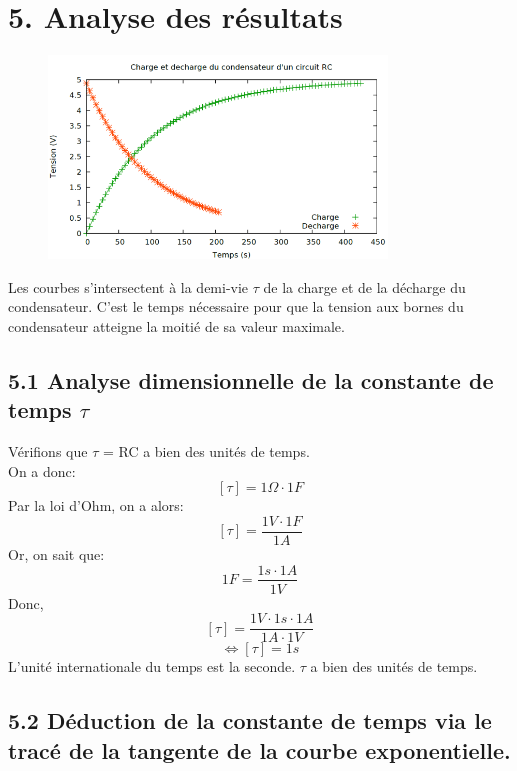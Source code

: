 \documentclass{report}
\begin{document}
\section*{5. Analyse des r\'esultats}
\begin{figure}[ht!]
\centering
\includegraphics[width=90mm]{chargeEtDech.png}
\label{overflow}
\end{figure}
Les courbes s'intersectent \`a la demi-vie $\tau$ de la charge et de la d\'echarge du condensateur. C'est le temps n\'ecessaire pour que la tension aux bornes du condensateur atteigne la moiti\'e de sa valeur maximale.
\subsection*{5.1 Analyse dimensionnelle de la constante de temps $\tau$ }
V\'erifions que $\tau$ = RC a bien des unit\'es de temps.
\\
On a donc:
   $$[\tau] = 1\Omega \cdot 1F$$
Par la loi d'Ohm, on a alors:
   $$[\tau] = \frac{1V \cdot 1F}{1A}$$
Or, on sait que:
   $$1F = \frac{1s \cdot 1A}{1V}$$
Donc,
   $$[\tau] = \frac{1V \cdot 1s \cdot 1A}{1A \cdot 1V}$$
  $$\Leftrightarrow [\tau] = 1s$$
L'unit\'e internationale du temps est la seconde. $\tau$ a bien des unit\'es de temps.  

\subsection*{5.2 D\'eduction de la constante de temps via le trac\'e de la tangente de la courbe exponentielle.}
\hspace*{0.5cm}
\end{document}
